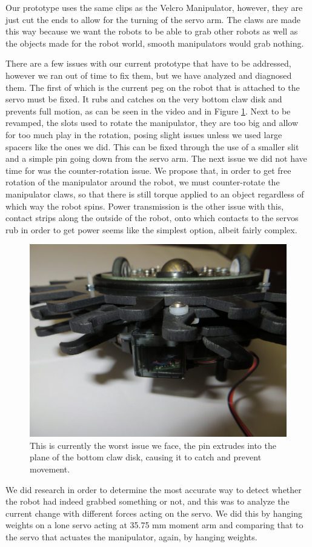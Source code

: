 \documentclass[12pt,onecolumn]{report}
\begin{document}
Our prototype uses the same clips as the Velcro Manipulator, however, they are just cut the ends to allow for the turning of the servo arm. The claws are made this way because we want the robots to be able to grab other robots as well as the objects made for the robot world, smooth manipulators would grab nothing. 

There are a few issues with our current prototype that have to be addressed, however we ran out of time to fix them, but we have analyzed and diagnosed them. The first of which is the current peg on the robot that is attached to the servo must be fixed. It rubs and catches on the very bottom claw disk and prevents full motion, as can be seen in the video and in Figure \ref{fig:problem}. Next to be revamped, the slots used to rotate the manipulator, they are too big and allow for too much play in the rotation, posing slight issues unless we used large spacers like the ones we did. This can be fixed through the use of a smaller slit and a simple pin going down from the servo arm. The next issue we did not have time for was the counter-rotation issue. We propose that, in order to get free rotation of the manipulator around the robot, we must counter-rotate the manipulator claws, so that there is still torque applied to an object regardless of which way the robot spins. Power transmission is the other issue with this, contact strips along the outside of the robot, onto which contacts to the servos rub in order to get power seems like the simplest option, albeit fairly complex.

\begin{figure}[ht]
\begin{center}
\includegraphics[width=.5\linewidth]{./Figs/bottom_problem.jpg}
\end{center}
\caption{This is currently the worst issue we face, the pin extrudes into the plane of the bottom claw disk, causing it to catch and prevent movement.}
\label{fig:problem}
\end{figure}

We did research in order to determine the most accurate way to detect whether the robot had indeed grabbed something or not, and this was to analyze the current change with different forces acting on the servo. We did this by hanging weights on a lone servo acting at 35.75 mm moment arm and comparing that to the servo that actuates the manipulator, again, by hanging weights. 
\end{document}
